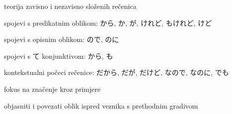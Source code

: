 
\author{Tomislav Mamić}

	
	
	\begin{hyou}
		\item teorija zavisno i nezavisno složenih rečenica
		\item spojevi s predikatnim oblikom: から, か, が, けれど, もけれど, けど
		\item spojevi s opisnim oblikom: ので, のに
		\item spojevi s て konjunktivom: から, も
		\item kontekstualni počeci rečenice: だから, だが, だけど, なので, なのに, でも
	\end{hyou}

	
	\begin{hyou}
		\item fokus na značenje kroz primjere
		\item objasniti i povezati oblik ispred veznika s prethodnim gradivom
	\end{hyou}
